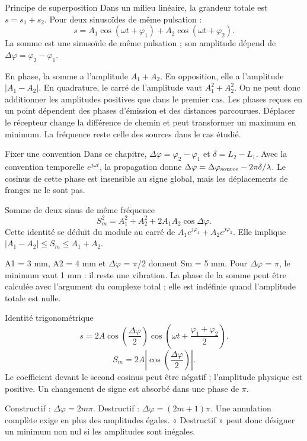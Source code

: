 \begin{loi}{Principe de superposition}
Dans un milieu linéaire, la grandeur totale est $s=s_1+s_2$. Pour deux sinusoïdes de même pulsation :\[s=A_1\cos(\omega t+\varphi_1)+A_2\cos(\omega t+\varphi_2).\]La somme est une sinusoïde de même pulsation ; son amplitude dépend de $\Delta\varphi=\varphi_2-\varphi_1$.
\end{loi}
En phase, la somme a l’amplitude $A_1+A_2$. En opposition, elle a l’amplitude $|A_1-A_2|$. En quadrature, le carré de l’amplitude vaut $A_1^2+A_2^2$. On ne peut donc additionner les amplitudes positives que dans le premier cas.
Les phases reçues en un point dépendent des phases d’émission et des distances parcourues. Déplacer le récepteur change la différence de chemin et peut transformer un maximum en minimum. La fréquence reste celle des sources dans le cas étudié.
\begin{methode}{Fixer une convention}
Dans ce chapitre, $\Delta\varphi=\varphi_2-\varphi_1$ et $\delta=L_2-L_1$. Avec la convention temporelle $e^{j\omega t}$, la propagation donne $\Delta\varphi=\Delta\varphi_{\rm source}-2\pi\delta/\lambda$. Le cosinus de cette phase est insensible au signe global, mais les déplacements de franges ne le sont pas.
\end{methode}


\begin{loi}{Somme de deux sinus de même fréquence}
\[S_m^2=A_1^2+A_2^2+2A_1A_2\cos\Delta\varphi.\]Cette identité se déduit du module au carré de $A_1e^{j\varphi_1}+A_2e^{j\varphi_2}$. Elle implique $|A_1-A_2|\leq S_m\leq A_1+A_2$.
\end{loi}
A1 = 3 mm, A2 = 4 mm et \ensuremath{\Delta}\ensuremath{\varphi} = \ensuremath{\pi}/2 donnent Sm = 5 mm. Pour \ensuremath{\Delta}\ensuremath{\varphi} = \ensuremath{\pi}, le minimum vaut 1 mm : il reste une vibration. La phase de la somme peut être calculée avec l’argument du complexe total ; elle est indéfinie quand l’amplitude totale est nulle.


\begin{loi}{Identité trigonométrique}
\[s=2A\cos\left(\frac{\Delta\varphi}{2}\right)\cos\left(\omega t+\frac{\varphi_1+\varphi_2}{2}\right).\]\[S_m=2A\left|\cos\left(\frac{\Delta\varphi}{2}\right)\right|.\]Le coefficient devant le second cosinus peut être négatif ; l’amplitude physique est positive. Un changement de signe est absorbé dans une phase de \ensuremath{\pi}.
\end{loi}
Constructif : $\Delta\varphi=2m\pi$. Destructif : $\Delta\varphi=(2m+1)\pi$. Une annulation complète exige en plus des amplitudes égales. « Destructif » peut donc désigner un minimum non nul si les amplitudes sont inégales.


